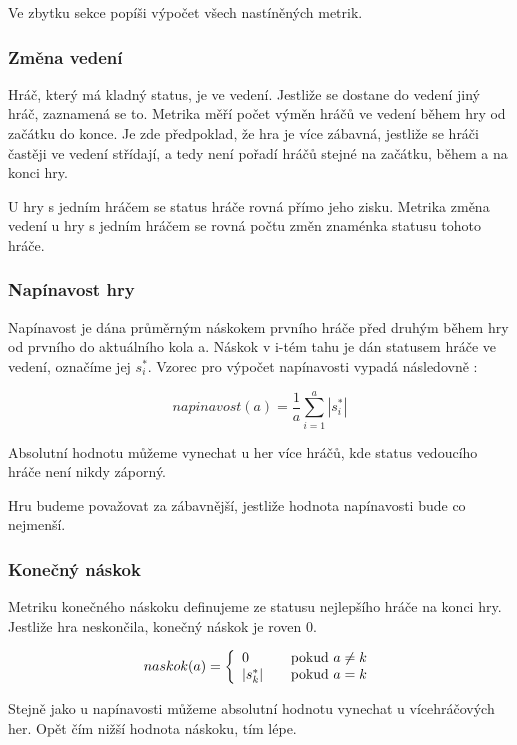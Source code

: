 Ve zbytku sekce popíši výpočet všech nastíněných metrik.

\subsubsection{Změna vedení}

Hráč, který má kladný status, je ve vedení. Jestliže se dostane do vedení jiný hráč, zaznamená se to. Metrika měří počet výměn hráčů ve vedení během hry od začátku do konce. Je zde předpoklad, že hra je více zábavná, jestliže se hráči častěji ve vedení střídají, a tedy není pořadí hráčů stejné na začátku, během a na konci hry. 

U hry s jedním hráčem se status hráče rovná přímo jeho zisku. Metrika změna vedení u hry s jedním hráčem se rovná počtu změn znaménka statusu tohoto hráče.

\subsubsection{Napínavost hry}
Napínavost je dána průměrným náskokem prvního hráče před druhým během hry od prvního do aktuálního kola a. Náskok v i-tém tahu je dán statusem hráče ve vedení, označíme jej $s^*_i$. Vzorec pro výpočet napínavosti vypadá následovně :

	\[
	napinavost(a) = \frac{1}{a}\sum_{i=1}^a{|s^*_i|}
\]

Absolutní hodnotu můžeme vynechat u her více hráčů, kde status vedoucího hráče není nikdy záporný.

Hru budeme považovat za zábavnější, jestliže hodnota napínavosti bude co nejmenší.

\subsubsection{Konečný náskok}

Metriku konečného náskoku definujeme ze statusu nejlepšího hráče na konci hry. Jestliže hra neskončila, konečný náskok je roven 0.

	\[
	naskok(a) = \left\{
  \begin{array}{l l}
    0 & \quad \text{pokud $a \neq k$}\\
    |s^*_k| & \quad \text{pokud $a = k$}
  \end{array} \right.
\]

Stejně jako u napínavosti můžeme absolutní hodnotu vynechat u vícehráčových her. Opět čím nižší hodnota náskoku, tím lépe.

